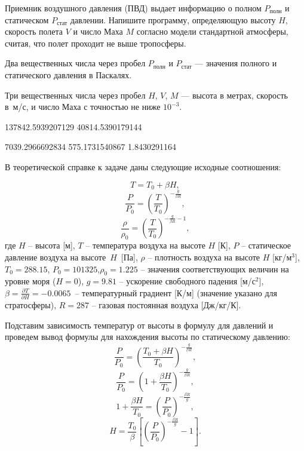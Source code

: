 
Приемник воздушного давления (ПВД) выдает информацию о полном 
$P_{\text{полн}}$ и статическом $P_{\text{стат}}$ давлении. Напишите программу, 
определяющую высоту $H$, скорость полета $V$ и число Маха $M$ согласно модели
стандартной атмосферы, считая, что полет проходит не выше тропосферы.


Два вещественных числа через пробел $P_{\text{полн}}$ и $P_{\text{стат}}$ — значения полного и статического давления в Паскалях.

\outputfmtSection

Три вещественных числа через пробел $H$, $V$, $M$ — высота в метрах, скорость в~м/с, и число 
Маха с точностью не ниже $10^{-3}$.


\begin{myverbbox}[\small]{\vinput}
    137842.5939207129 40814.5390179144
\end{myverbbox}
\begin{myverbbox}[\small]{\voutput}
    7039.2966692834 575.1731540867 1.8430291164
\end{myverbbox}

\solutionSection

В теоретической справке к задаче даны следующие исходные соотношения:

$$T=T_0+ \beta H,$$
$$\frac{P}{P_0} =\left(\frac{T}{T_0}\right)^{-\frac{g}{\beta R}},$$
$$\frac{\rho}{\rho_0} =\left(\frac{T}{T_0}\right)^{-\frac{g}{\beta R} - 1},$$
где $H$ – высота [м], $T$ – температура воздуха на высоте $H$ [К], $P$ – статическое давление воздуха на 
высоте~$H$~[Па], $\rho$ – плотность воздуха на высоте $H$ [кг/м$^3$], $T_0=288.15$, $P_0=101325$,$\rho_0=1.225$ – 
значения соответствующих величин на уровне моря ($H=0$), $g=9.81$ – ускорение свободного падения [м/с$^2$],  
$\beta =\frac{\partial T}{\partial H}=-0.0065$~– температурный градиент [К/м] (значение указано для стратосферы), 
$R=287$ – газовая постоянная воздуха [Дж/кг/К]. 

Подставим зависимость температур от высоты в формулу для давлений и проведем вывод формулы для нахождения высоты 
по статическому давлению:
$$\frac{P}{P_0} =\left(\frac{T_0+ \beta H}{T_0}\right)^{-\frac{g}{\beta R}},$$
$$\frac{P}{P_0} =\left(1+ \frac{\beta H}{T_0} \right)^{-\frac{g}{\beta R}},$$
$$1+ \frac{\beta H}{T_0} =\left(\frac{P}{P_0} \right)^{-\frac{\beta R}{g}},$$
$$H=\frac{T_0}{\beta}\left[\left(\frac{P}{P_0}\right)^{-\frac{\beta R}{g}}-1 \right].$$

